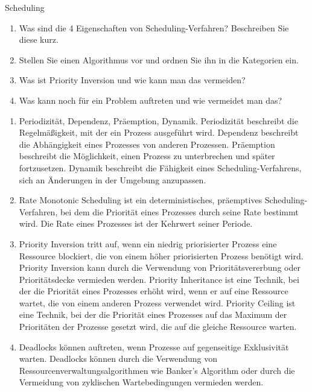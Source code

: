 \documentclass{article}
\begin{document}
\begin{exercise}{Scheduling}
  \begin{enumerate}
    \item Was sind die 4 Eigenschaften von Scheduling-Verfahren? Beschreiben Sie diese kurz.
    \item Stellen Sie einen Algorithmus vor und ordnen Sie ihn in die Kategorien ein.
    \item Was ist Priority Inversion und wie kann man das vermeiden?
    \item Was kann noch für ein Problem auftreten und wie vermeidet man das?
  \end{enumerate}

  \begin{solution}
    \begin{enumerate}
      \item Periodizität, Dependenz, Präemption, Dynamik.
            Periodizität beschreibt die Regelmäßigkeit, mit der ein Prozess ausgeführt wird.
            Dependenz beschreibt die Abhängigkeit eines Prozesses von anderen Prozessen.
            Präemption beschreibt die Möglichkeit, einen Prozess zu unterbrechen und später fortzusetzen.
            Dynamik beschreibt die Fähigkeit eines Scheduling-Verfahrens, sich an Änderungen in der Umgebung anzupassen.
      \item Rate Monotonic Scheduling ist ein deterministisches, präemptives Scheduling-Verfahren, bei dem die Priorität eines Prozesses durch seine Rate bestimmt wird. Die Rate eines Prozesses ist der Kehrwert seiner Periode.
      \item Priority Inversion tritt auf, wenn ein niedrig priorisierter Prozess eine Ressource blockiert, die von einem höher priorisierten Prozess benötigt wird. Priority Inversion kann durch die Verwendung von Prioritätsvererbung oder Prioritätsdecke vermieden werden.
            Priority Inheritance ist eine Technik, bei der die Priorität eines Prozesses erhöht wird, wenn er auf eine Ressource wartet, die von einem anderen Prozess verwendet wird.
            Priority Ceiling ist eine Technik, bei der die Priorität eines Prozesses auf das Maximum der Prioritäten der Prozesse gesetzt wird, die auf die gleiche Ressource warten.
      \item Deadlocks können auftreten, wenn Prozesse auf gegenseitige Exklusivität warten. Deadlocks können durch die Verwendung von Ressourcenverwaltungsalgorithmen wie Banker's Algorithm oder durch die Vermeidung von zyklischen Wartebedingungen vermieden werden.
    \end{enumerate}
  \end{solution}
\end{exercise}
\end{document}
